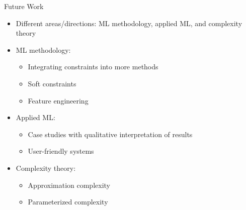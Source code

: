 \documentclass[en, navbarinline, handout]{sdqbeamer}
\begin{document}
\begin{frame}[t]{Future Work}
	\begin{itemize}
		\item Different areas/directions: ML methodology, applied ML, and complexity theory
		\vspace{\baselineskip}
		\item ML methodology:
		\begin{itemize}
			\item Integrating constraints into more methods
			\item Soft constraints
			\item Feature engineering
		\end{itemize}
		\item Applied ML:
		\begin{itemize}
			\item Case studies with qualitative interpretation of results
			\item User-friendly systems
		\end{itemize}
		\item Complexity theory:
		\begin{itemize}
			\item Approximation complexity
			\item Parameterized complexity
		\end{itemize}
	\end{itemize}
\end{frame}
\end{document}

